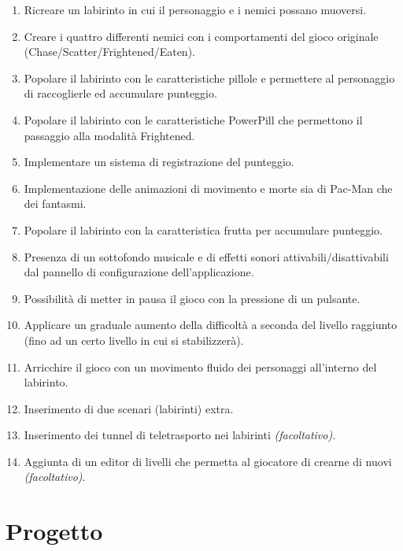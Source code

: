 \documentclass[12pt,a4paper]{report}
\begin{document}
\begin{enumerate}
  \item Ricreare un labirinto in cui il personaggio e i nemici possano muoversi.
  \item Creare i quattro differenti nemici con i comportamenti del gioco originale (Chase/Scatter/Frightened/Eaten).
  \item Popolare il labirinto con le caratteristiche pillole e permettere al personaggio di raccoglierle ed accumulare punteggio.
  \item Popolare il labirinto con le caratteristiche PowerPill che permettono il passaggio alla modalità Frightened.
  \item Implementare un sistema di registrazione del punteggio.
  \item Implementazione delle animazioni di movimento e morte sia di Pac-Man che dei fantasmi.
  \item Popolare il labirinto con la caratteristica frutta per accumulare punteggio.
  \item Presenza di un sottofondo musicale e di effetti sonori attivabili/disattivabili dal pannello di configurazione dell’applicazione.
  \item Possibilità di metter in pausa il gioco con la pressione di un pulsante.
  \item Applicare un graduale aumento della difficoltà a seconda del livello raggiunto (fino ad un certo livello in cui si stabilizzerà).
  \item Arricchire il gioco con un movimento fluido dei personaggi all'interno del labirinto.
  \item Inserimento di due scenari (labirinti) extra.
  \item Inserimento dei tunnel di teletrasporto nei labirinti \textit{(facoltativo)}.
  \item Aggiunta di un editor di livelli che permetta al giocatore di crearne di nuovi \textit{(facoltativo)}.
\end{enumerate}



\chapter{Progetto}\label{ch:prog}

\end{document}
